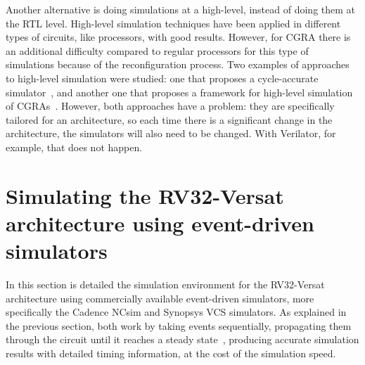 \documentclass[conference]{IEEEtran}
\begin{document}
Another alternative is doing simulations at a high-level, instead of doing them
at the \ac{RTL} level. High-level simulation techniques have been applied in
different types of circuits, like processors, with good results. However, for
\ac{CGRA} there is an additional difficulty compared to regular processors for
this type of simulations because of the reconfiguration process. Two examples of
approaches to high-level simulation were studied: one that proposes a
cycle-accurate simulator~\cite{chen:CGRA}, and another one that proposes a
framework for high-level simulation of \ac{CGRA}s~\cite{pasha:CGRA}. However,
both approaches have a problem: they are specifically tailored for an
architecture, so each time there is a significant change in the architecture,
the simulators will also need to be changed. With Verilator, for example, that
does not happen.


\section{Simulating the RV32-Versat architecture using event-driven simulators}
\label{chapter:sim_event}

In this section is detailed the simulation environment for the RV32-Versat architecture 
using commercially available event-driven simulators, more specifically the Cadence NCsim 
and Synopsys VCS simulators. As explained in the previous section, both work by taking 
events sequentially, propagating them through the circuit until it reaches a steady 
state~\cite{tan:vhstas,gunes:survey,palnitkar:verilog}, producing accurate simulation 
results with detailed timing information, at the cost of the simulation speed.
\end{document}
